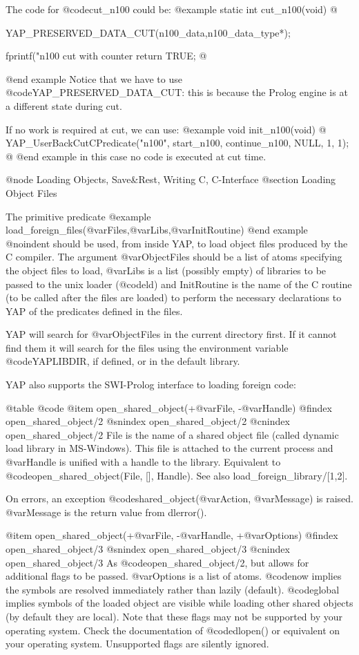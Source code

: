 {{{{{{{{{The code for @code{cut_n100} could be:
@example
static int cut_n100(void)
@{
  YAP_PRESERVED_DATA_CUT(n100_data,n100_data_type*);

  fprintf("n100 cut with counter %
  return TRUE;
@}
@end example
Notice that we have to use @code{YAP_PRESERVED_DATA_CUT}: this is because the Prolog engine is at a different state during cut.

If no work is required at cut, we can use:
@example
void
init_n100(void)
@{
  YAP_UserBackCutCPredicate("n100", start_n100, continue_n100, NULL, 1, 1);
@}
@end example
in this case no code is executed at cut time.

@node Loading Objects, Save&Rest, Writing C, C-Interface
@section Loading Object Files

The primitive predicate
@example
      load_foreign_files(@var{Files},@var{Libs},@var{InitRoutine})
@end example
@noindent
should be used, from inside YAP, to load object files produced by the C
compiler. The argument @var{ObjectFiles} should be a list of atoms
specifying the object files to load, @var{Libs} is a list (possibly
empty) of libraries to be passed to the unix loader (@code{ld}) and
InitRoutine is the name of the C routine (to be called after the files
are loaded) to perform the necessary declarations to YAP of the
predicates defined in the files. 

YAP will search for @var{ObjectFiles} in the current directory first. If
it cannot find them it will search for the files using the environment
variable @code{YAPLIBDIR}, if defined, or in the default library.

YAP also supports the SWI-Prolog interface to loading foreign code:

@table @code
@item open_shared_object(+@var{File}, -@var{Handle})
@findex open_shared_object/2
@snindex open_shared_object/2
@cnindex open_shared_object/2
    File is the name of a shared object file (called dynamic load
    library in MS-Windows). This file is attached to the current process
    and @var{Handle} is unified with a handle to the library. Equivalent to
    @code{open_shared_object(File, [], Handle)}. See also
    load_foreign_library/[1,2].

    On errors, an exception @code{shared_object}(@var{Action},
    @var{Message}) is raised. @var{Message} is the return value from
    dlerror().

@item open_shared_object(+@var{File}, -@var{Handle}, +@var{Options})
@findex open_shared_object/3
@snindex open_shared_object/3
@cnindex open_shared_object/3
    As @code{open_shared_object/2}, but allows for additional flags to
    be passed. @var{Options} is a list of atoms. @code{now} implies the
    symbols are 
    resolved immediately rather than lazily (default). @code{global} implies
    symbols of the loaded object are visible while loading other shared
    objects (by default they are local). Note that these flags may not
    be supported by your operating system. Check the documentation of
    @code{dlopen()} or equivalent on your operating system. Unsupported
    flags  are silently ignored. 

}}}}}}}}}
